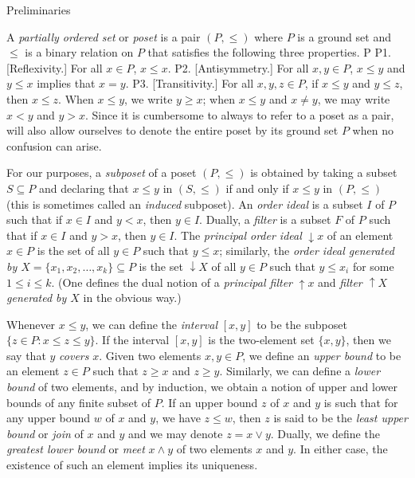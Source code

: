 


\def\down{\downarrow\!}
\def\up{\uparrow\!}

\advsect Preliminaries

A {\it partially ordered set} or {\it poset}
is a pair $(P,\leq)$ where $P$ is a ground set and $\leq$ is a binary relation on $P$
that satisfies the following three properties.
\medskip\axiombegin P
\axiom P1. [Reflexivity.] For all $x\in P$, $x\leq x$.
\smallskip
\axiom P2. [Antisymmetry.] For all $x,y\in P$, $x\leq y$ and $y\leq x$ implies that $x=y$.
\smallskip
\axiom P3. [Transitivity.] For all $x,y,z\in P$, if $x\leq y$ and $y\leq z$, then $x\leq z$.
\medskip
\noindent
When $x\leq y$, we write $y\geq x$; when $x\leq y$ and $x\neq y$, we may write $x<y$ and $y>x$.
Since it is cumbersome to always to refer to a poset as a pair,
will also allow ourselves to denote the entire poset by its ground set $P$ when no confusion can arise.

For our purposes, a {\it subposet} of a poset $(P,\leq)$ is obtained by taking a subset $S\subseteq P$
and declaring that $x\leq y$ in $(S,\leq)$ if and only if $x\leq y$ in $(P,\leq)$ (this is sometimes
called an {\it induced} subposet). An {\it order ideal} is a subset $I$ of $P$ such that if $x\in I$ and
$y<x$, then $y\in I$. Dually, a {\it filter} is a
subset $F$ of $P$ such that if $x\in I$ and $y>x$, then $y\in I$. The {\it principal order ideal} $\down x$
of an element $x\in P$ is the set of all $y\in P$ such that $y\leq x$; similarly, the {\it order ideal generated
by $X = \{x_1,x_2,\ldots,x_k\}\subseteq P$} is the set $\down X$
of all $y\in P$ such that $y\leq x_i$ for some $1\leq i\leq k$.
(One defines the dual notion of a {\it principal filter} $\up x$ and {\it filter $\up X$
generated by $X$} in the obvious way.)

Whenever $x\leq y$, we can define the {\it interval} $[x,y]$ to be the subposet $\{z\in P: x\leq z\leq y\}$.
If the interval $[x,y]$ is the two-element set $\{x,y\}$, then we say that $y$ {\it covers} $x$.
Given two elements $x,y\in P$, we define an {\it upper bound} to be an element $z\in P$ such that
$z\geq x$ and $z\geq y$. Similarly, we can define a {\it lower bound} of two elements, and by induction,
we obtain a notion of upper and lower bounds of any finite subset of $P$. If an upper bound $z$ of $x$ and $y$
is such that for any upper bound $w$ of $x$ and $y$, we have $z\leq w$, then $z$ is said to be the {\it least
upper bound} or {\it join}
of $x$ and $y$ and we may denote $z=x\vee y$. Dually, we define the {\it greatest lower bound} or {\it meet}
$x\wedge y$ of two elements $x$ and $y$. In either case, the existence of such an element
implies its uniqueness.



\bye
